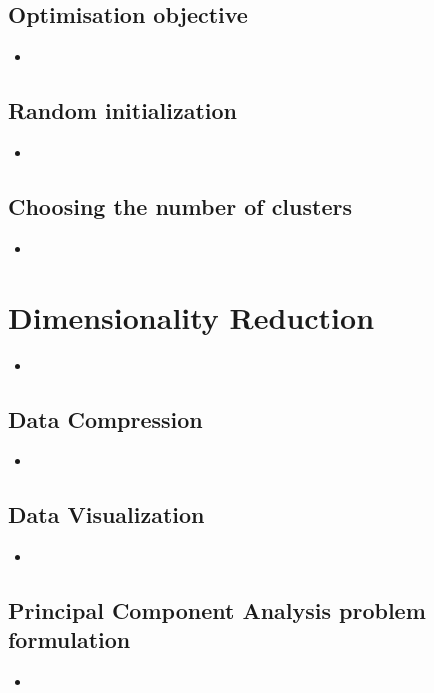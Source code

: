 \documentclass[13pt]{book}
\begin{document}
\section{Optimisation objective}
\begin{itemize}
  \item
\end{itemize}

\section{Random initialization}
\begin{itemize}
  \item
\end{itemize}

\section{Choosing the number of clusters}
\begin{itemize}
  \item
\end{itemize}

\chapter{Dimensionality Reduction}
\begin{itemize}
  \item
\end{itemize}

\section{Data Compression}
\begin{itemize}
  \item
\end{itemize}

\section{Data Visualization}
\begin{itemize}
  \item
\end{itemize}

\section{Principal Component Analysis problem formulation}
\begin{itemize}
  \item
\end{itemize}
\end{document}
